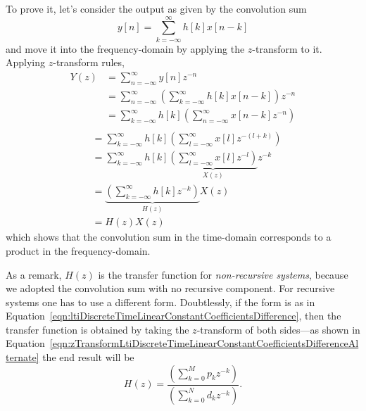 \documentclass[\documentfontsize, twocolumn]{\classname}
\begin{document}
To prove it, let's consider the output as given by the convolution sum
\[
    y[n] = \sum_{k=-\infty}^\infty h[k] x[n-k]
\]
and move it into the frequency-domain by applying the $z$-transform to it. Applying $z$-transform rules,
\begin{align*}
    Y(z) 
    &= \sum_{n=-\infty}^\infty y[n]z^{-n} \\
    &= \sum_{n=-\infty}^\infty \left(\sum_{k=-\infty}^\infty h[k] x[n-k]\right)z^{-n}\\
    &= \sum_{k=-\infty}^\infty h[k] \left(\sum_{n=-\infty}^\infty x[n-k]z^{-n}\right)\\
\end{align*}
\begin{align*}
    &= \sum_{k=-\infty}^\infty h[k] \left(\sum_{l=-\infty}^\infty x[l]z^{-(l+k)}\right)\\
    &= \sum_{k=-\infty}^\infty h[k] \underbrace{\left(\sum_{l=-\infty}^\infty x[l]z^{-l}\right)}_{X(z)}z^{-k}\\
    &= \underbrace{\left(\sum_{k=-\infty}^\infty h[k]z^{-k}\right)}_{H(z)} X(z)\\
    &= H(z)X(z)
\end{align*}
which shows that the convolution sum in the time-domain corresponds to a product in the frequency-domain. 

As a remark, $H(z)$ is the transfer function for \emph{non-recursive systems}, because we adopted the convolution sum with no recursive component. For recursive systems one has to use a different form. Doubtlessly, if the form is as in Equation~\ref{eqn:ltiDiscreteTimeLinearConstantCoefficientsDifference}, then the transfer function is obtained by taking the $z$-transform of both sides---as shown in Equation~\ref{eqn:zTransformLtiDiscreteTimeLinearConstantCoefficientsDifferenceAlternate} the end result will be
\begin{equation}\label{eqn:transferFunctionRecursiveSystems}
    H(z) = \frac {
        \left(\sum_{k=0}^M p_k z^{-k}\right)
    } {
        \left(\sum_{k=0}^N d_k z^{-k}\right)
    }.
\end{equation}
\end{document}

